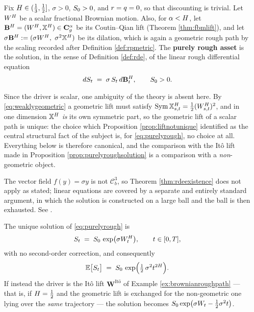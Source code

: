 \begin{definition}\label{def:purelyrough}
Fix $H \in (\tfrac13,\tfrac12]$, $\sigma>0$, $S_0>0$, and $r = q = 0$, so
that discounting is trivial. Let $W^{H}$ be a scalar fractional Brownian motion. Also,  for  $\alpha<H$, let 
$\mathbf{B}^{H} = (W^{H},\mathbb{X}^{H}) \in \mathbf{C}_{g}^{\alpha}$  be its
Coutin--Qian lift (Theorem \ref{thm:fbmlift}), and let
$\sigma\mathbf{B}^{\Hurst} := (\sigma\BH,\ \sigma^2\lev^{\Hurst})$ be its dilation, which is again a
geometric rough path by the scaling recorded after Definition \ref{def:rpmetric}. The \textbf{purely rough asset} is the
solution, in the sense of Definition \ref{def:rde}, of the linear rough differential equation
\begin{equation}\label{eq:purelyrough}
d S_t \;=\; \sigma\,S_t\,d\mathbf{B}^{H}_t , \qquad S_0 > 0 .
\end{equation}
\end{definition}

Since the driver is scalar, one ambiguity of the theory is absent here. By \eqref{eq:weaklygeometric} a geometric lift must satisfy
$\operatorname{Sym}\mathbb{X}^{H}_{s,t} = \tfrac12(W^{H}_{s,t})^2$, and in one dimension $\mathbb{X}^{H}$ \emph{is} its
own symmetric part, so the geometric lift of a scalar path is unique: the choice which Proposition
\ref{prop:liftnotunique} identified as the central structural fact of the subject is, for
\eqref{eq:purelyrough}, no choice at all. Everything below is therefore canonical, and the
comparison with the Itô lift made in Proposition \ref{prop:purelyroughsolution} is a comparison
with a \emph{non}-geometric object.

 \begin{remark}
The vector field $f(y) = \sigma y$ is not
$\mathcal{C}^3_b$, so Theorem \ref{thm:rdeexistence} does not apply as stated; linear equations are
covered by a separate and entirely standard argument, in which the solution is constructed on a
large ball and the ball is then exhausted. See \cite{geng2021}. 
\end{remark}



\begin{proposition}\label{prop:purelyroughsolution}
The unique solution of \eqref{eq:purelyrough} is
\begin{equation}\label{eq:purelyroughsolution}
S_t \;=\; S_0\,\exp\bigl(\sigma W^{H}_t\bigr), \qquad t \in [0,T],
\end{equation}
with no second-order correction, and consequently
\begin{equation}\label{eq:purelyroughmean}
\mathbb{E}\bigl[S_t\bigr] \;=\; S_0\,\exp\Bigl(\tfrac12\,\sigma^2 t^{2H}\Bigr).
\end{equation}
If instead the driver is the Itô lift $\mathbf{W}^{\mathrm{It\hat o}}$ of Example
\ref{ex:brownianroughpath} --- that is, if $H = \tfrac12$ and the geometric lift is exchanged
for the non-geometric one lying over the \emph{same} trajectory --- the solution becomes
$S_0\exp\bigl(\sigma W_t - \tfrac12\sigma^2 t\bigr)$.
\end{proposition}

